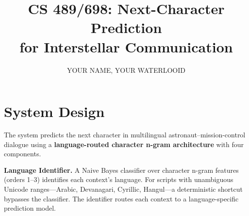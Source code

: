 \documentclass[11pt]{article}
\title{\vspace{-1.5em}CS 489/698: Next-Character Prediction \\ for Interstellar Communication\vspace{-0.5em}}
\author{YOUR NAME, YOUR WATERLOOID}
\date{}
\begin{document}
\maketitle
\vspace{-2em}

\section{System Design}

The system predicts the next character in multilingual astronaut--mission-control dialogue using a \textbf{language-routed character n-gram architecture} with four components.

\textbf{Language Identifier.}
A Naive Bayes classifier over character n-gram features (orders 1--3) identifies each context's language. For scripts with unambiguous Unicode ranges---Arabic, Devanagari, Cyrillic, Hangul---a deterministic shortcut bypasses the classifier. The identifier routes each context to a language-specific prediction model.
\end{document}
